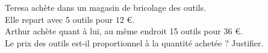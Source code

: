 \documentclass[11pt]{article}
\begin{document}
\phantom{0}
\vspace{-.5cm}


\begin{center}
\end{center}

\renewcommand{\arraystretch}{2}


\begin{exercicedevoir}
Teresa achète dans un magasin de bricolage des outils.\\Elle  repart
avec 5 outils pour $12$\,\,€.\\ Arthur achète quant à lui, au même
endroit 15 outils pour $36$\,\,€.\\Le prix des outils est-il
proportionnel à la quantité achetée  ? Justifier. \\ \dtf \\ \dtf
\end{exercicedevoir}
\end{document}
